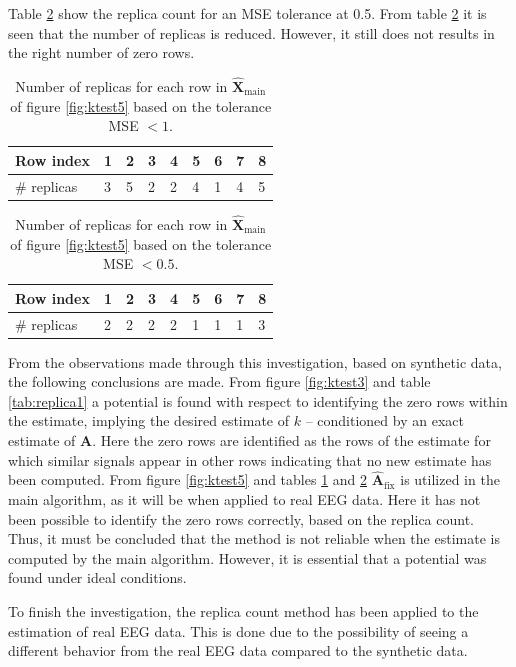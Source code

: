 Table \ref{tab:replica6} show the replica count for an MSE tolerance at 0.5. 
From table \ref{tab:replica6} it is seen that the number of replicas is reduced.
However, it still does not results in the right number of zero rows.  
\begin{table}[H]
\center
\begin{tabular}{|l|l|l|l|l|l|l|l|l|}
\hline
Row index   & 1 & 2 & 3 & 4 & 5 & 6 & 7 & 8 \\ \hline
\# replicas & 3 & 5 & 2 & 2 & 4 & 1 & 4 & 5 \\ \hline
\end{tabular}
\caption{Number of replicas for each row in $\hat{\mathbf{X}}_{\text{main}}$ of figure \ref{fig:ktest5} based on the tolerance MSE $< 1$.}
\label{tab:replica5}
\end{table}
\noindent
\begin{table}[H]
\center
\begin{tabular}{|l|l|l|l|l|l|l|l|l|}
\hline
Row index   & 1 & 2 & 3 & 4 & 5 & 6 & 7 & 8 \\ \hline
\# replicas & 2 & 2 & 2 & 2 & 1 & 1 & 1 & 3 \\ \hline
\end{tabular}
\caption{Number of replicas for each row in $\hat{\mathbf{X}}_{\text{main}}$ of figure \ref{fig:ktest5} based on the tolerance MSE $< 0.5$.}
\label{tab:replica6}
\end{table}
\noindent
From the observations made through this investigation, based on synthetic data, the following conclusions are made.
From figure \ref{fig:ktest3} and table \ref{tab:replica1} a potential is found with respect to identifying the zero rows within the estimate, implying the desired estimate of $k$ -- conditioned by an exact estimate of $\textbf{A}$. 
Here the zero rows are identified as the rows of the estimate for which similar signals appear in other rows indicating that no new estimate has been computed. 
From figure \ref{fig:ktest5} and tables \ref{tab:replica5} and \ref{tab:replica6} $\hat{\mathbf{A}}_{\text{fix}}$ is utilized in the main algorithm, as it will be when applied to real EEG data. 
Here it has not been possible to identify the zero rows correctly, based on the replica count. 
Thus, it must be concluded that the method is not reliable when the estimate is computed by the main algorithm. 
However, it is essential that a potential was found under ideal conditions.

To finish the investigation, the replica count method has been applied to the estimation of real EEG data. This is done due to the possibility of seeing a different behavior from the real EEG data compared to the synthetic data. 

